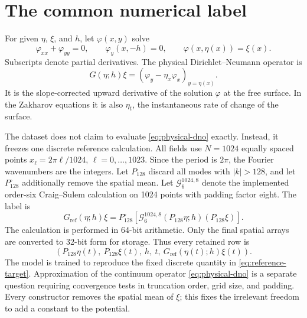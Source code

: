 \documentclass[10pt]{article}
\newcommand{\Gref}{G_{\mathrm{ref}}}
\begin{document}
\section{The common numerical label}
\label{sec:target}

For given $\eta$, $\xi$, and $h$, let $\varphi(x,y)$ solve
\begin{equation}
  \varphi_{xx}+\varphi_{yy}=0,\qquad
  \varphi_y(x,-h)=0,\qquad
  \varphi(x,\eta(x))=\xi(x).
\end{equation}
Subscripts denote partial derivatives.
The physical Dirichlet--Neumann operator is
\begin{equation}
  G(\eta;h)\xi
  =\left(\varphi_y-\eta_x\varphi_x\right)_{y=\eta(x)}.
  \label{eq:physical-dno}
\end{equation}
It is the slope-corrected upward derivative of the solution $\varphi$ at the
free surface.  In the Zakharov equations it is also $\eta_t$, the
instantaneous rate of change of the surface.

The dataset does not claim to evaluate \eqref{eq:physical-dno} exactly.
Instead, it freezes one discrete reference calculation.  All fields use
$N=1024$ equally spaced points
$x_\ell=2\pi\ell/1024$, $\ell=0,\ldots,1023$.  Since the period is $2\pi$,
the Fourier wavenumbers are the integers.  Let $P_{128}$ discard all modes with
$|k|>128$, and let $P_{128}^{\circ}$ additionally remove the spatial mean.
Let $\mathcal G_{6}^{1024,8}$ denote the implemented order-six
Craig--Sulem calculation on 1024 points with padding factor eight.  The label
is
\begin{equation}
  \boxed{
  \Gref(\eta;h)\xi
  =
  P_{128}^{\circ}\!\left[
    \mathcal G_{6}^{1024,8}
      (P_{128}\eta;h)(P_{128}\xi)
  \right].}
  \label{eq:reference-target}
\end{equation}
The calculation is performed in 64-bit arithmetic.  Only the final spatial
arrays are converted to 32-bit form for storage.  Thus every retained row is
\begin{equation}
  \left(
    P_{128}\eta(t),\
    P_{128}\xi(t),\
    h,\
    t,\
    \Gref(\eta(t);h)\xi(t)
  \right).
  \label{eq:stored-row}
\end{equation}
The model is trained to reproduce the fixed discrete quantity in
\eqref{eq:reference-target}.  Approximation of the continuum operator
\eqref{eq:physical-dno} is a separate question requiring convergence tests
in truncation order, grid size, and padding.
Every constructor removes the spatial mean of $\xi$; this fixes the
irrelevant freedom to add a constant to the potential.
\end{document}
